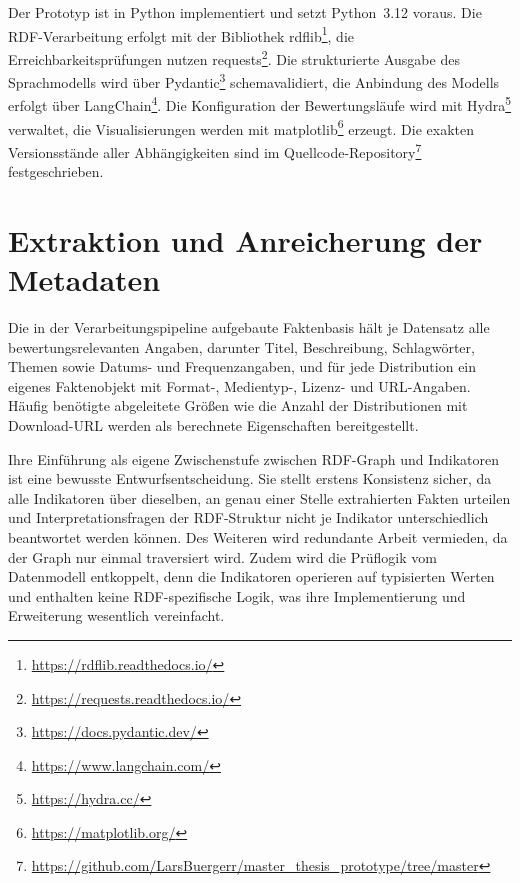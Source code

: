 Der Prototyp ist in Python implementiert und setzt Python~3.12 voraus. Die RDF-Verarbeitung erfolgt mit der Bibliothek rdflib\footnote{\url{https://rdflib.readthedocs.io/}}, die Erreichbarkeitsprüfungen nutzen requests\footnote{\url{https://requests.readthedocs.io/}}. Die strukturierte Ausgabe des Sprachmodells wird über Pydantic\footnote{\url{https://docs.pydantic.dev/}} schemavalidiert, die Anbindung des Modells erfolgt über LangChain\footnote{\url{https://www.langchain.com/}}. Die Konfiguration der Bewertungsläufe wird mit Hydra\footnote{\url{https://hydra.cc/}} verwaltet, die Visualisierungen werden mit matplotlib\footnote{\url{https://matplotlib.org/}} erzeugt. Die exakten Versionsstände aller Abhängigkeiten sind im Quellcode-Repository\footnote{\url{https://github.com/LarsBuergerr/master_thesis_prototype/tree/master}} festgeschrieben. 

\section{Extraktion und Anreicherung der Metadaten}
\label{sec:extraktion}

Die in der Verarbeitungspipeline aufgebaute Faktenbasis hält je Datensatz alle bewertungsrelevanten Angaben, darunter Titel, Beschreibung, Schlagwörter, Themen sowie Datums- und Frequenzangaben, und für jede Distribution ein eigenes Faktenobjekt mit Format-, Medientyp-, Lizenz- und URL-Angaben. Häufig benötigte abgeleitete Größen wie die Anzahl der Distributionen mit Download-URL werden als berechnete Eigenschaften bereitgestellt.

Ihre Einführung als eigene Zwischenstufe zwischen RDF-Graph und Indikatoren ist eine bewusste Entwurfsentscheidung. Sie stellt erstens Konsistenz sicher, da alle Indikatoren über dieselben, an genau einer Stelle extrahierten Fakten urteilen und Interpretationsfragen der RDF-Struktur nicht je Indikator unterschiedlich beantwortet werden können. Des Weiteren wird redundante Arbeit vermieden, da der Graph nur einmal traversiert wird. Zudem wird die Prüflogik vom Datenmodell entkoppelt, denn die Indikatoren operieren auf typisierten Werten und enthalten keine RDF-spezifische Logik, was ihre Implementierung und Erweiterung wesentlich vereinfacht.

